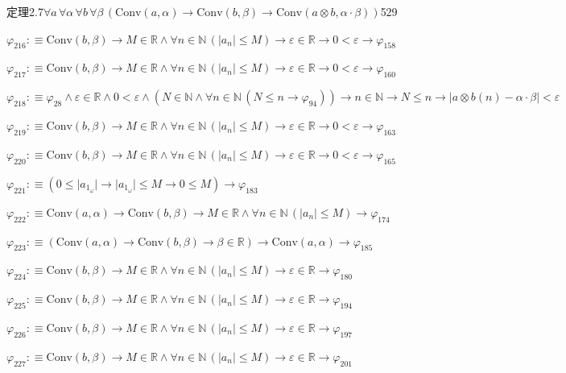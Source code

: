 \begin{fullproof}{定理2.7}{$\forall a\,\forall \alpha\,\forall b\,\forall \beta\,(\mathrm{Conv}(a,\alpha) \to \mathrm{Conv}(b,\beta) \to \mathrm{Conv}(a \otimes b,\alpha \cdot \beta))$}{529}
\begin{abbrevlist}
\item $\varphi_{216} :\equiv \mathrm{Conv}(b,\beta) \to M \in \mathbb{R} \land \forall n \in \mathbb{N}\,(\lvert a_{n} \rvert \leq M) \to \varepsilon \in \mathbb{R} \to 0 < \varepsilon \to \varphi_{158}$
\item $\varphi_{217} :\equiv \mathrm{Conv}(b,\beta) \to M \in \mathbb{R} \land \forall n \in \mathbb{N}\,(\lvert a_{n} \rvert \leq M) \to \varepsilon \in \mathbb{R} \to 0 < \varepsilon \to \varphi_{160}$
\item $\varphi_{218} :\equiv \varphi_{28} \land \varepsilon \in \mathbb{R} \land 0 < \varepsilon \land (N \in \mathbb{N} \land \forall n \in \mathbb{N}\,(N \leq n \to \varphi_{94})) \to n \in \mathbb{N} \to N \leq n \to \lvert a \otimes b(n) - \alpha \cdot \beta \rvert < \varepsilon$
\item $\varphi_{219} :\equiv \mathrm{Conv}(b,\beta) \to M \in \mathbb{R} \land \forall n \in \mathbb{N}\,(\lvert a_{n} \rvert \leq M) \to \varepsilon \in \mathbb{R} \to 0 < \varepsilon \to \varphi_{163}$
\item $\varphi_{220} :\equiv \mathrm{Conv}(b,\beta) \to M \in \mathbb{R} \land \forall n \in \mathbb{N}\,(\lvert a_{n} \rvert \leq M) \to \varepsilon \in \mathbb{R} \to 0 < \varepsilon \to \varphi_{165}$
\item $\varphi_{221} :\equiv (0 \leq \lvert a_{1_{\omega}} \rvert \to \lvert a_{1_{\omega}} \rvert \leq M \to 0 \leq M) \to \varphi_{183}$
\item $\varphi_{222} :\equiv \mathrm{Conv}(a,\alpha) \to \mathrm{Conv}(b,\beta) \to M \in \mathbb{R} \land \forall n \in \mathbb{N}\,(\lvert a_{n} \rvert \leq M) \to \varphi_{174}$
\item $\varphi_{223} :\equiv (\mathrm{Conv}(a,\alpha) \to \mathrm{Conv}(b,\beta) \to \beta \in \mathbb{R}) \to \mathrm{Conv}(a,\alpha) \to \varphi_{185}$
\item $\varphi_{224} :\equiv \mathrm{Conv}(b,\beta) \to M \in \mathbb{R} \land \forall n \in \mathbb{N}\,(\lvert a_{n} \rvert \leq M) \to \varepsilon \in \mathbb{R} \to \varphi_{180}$
\item $\varphi_{225} :\equiv \mathrm{Conv}(b,\beta) \to M \in \mathbb{R} \land \forall n \in \mathbb{N}\,(\lvert a_{n} \rvert \leq M) \to \varepsilon \in \mathbb{R} \to \varphi_{194}$
\item $\varphi_{226} :\equiv \mathrm{Conv}(b,\beta) \to M \in \mathbb{R} \land \forall n \in \mathbb{N}\,(\lvert a_{n} \rvert \leq M) \to \varepsilon \in \mathbb{R} \to \varphi_{197}$
\item $\varphi_{227} :\equiv \mathrm{Conv}(b,\beta) \to M \in \mathbb{R} \land \forall n \in \mathbb{N}\,(\lvert a_{n} \rvert \leq M) \to \varepsilon \in \mathbb{R} \to \varphi_{201}$

\end{abbrevlist}
\end{fullproof}
